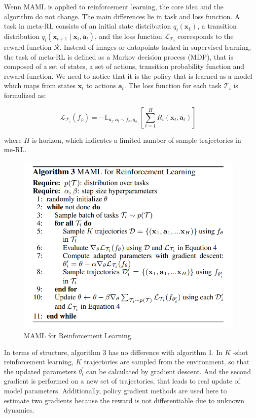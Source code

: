 Wenn MAML is applied to reinforcement learning, the core idea and the algorithm do not change. The main differences lie in task and loss function. A task in meta-RL consists of  
 an initial state distribution $q_{i}\left(\mathbf{x}_{1}\right)$, a transition distribution $q_{i}\left(\mathbf{x}_{t+1} \mid \mathbf{x}_{t}, \mathbf{a}_{t}\right)$, and the loss function $\mathcal{L}_{\mathcal{T}_{i}}$ corresponds to the reward function $\mathcal{R}$. Instead of images or datapoints tasked in supervised learning, the task of meta-RL is defined as a Markov decision process (MDP), that is composed of a set of states, a set of actions, transition probability function and reward function. We need to notice that it is the policy that is learned as a model which maps from states $\mathbf{x}_{t}$ to actions $\mathbf{a}_{t}$. The loss function for each task ${\mathcal{T}_{i}}$
 is formulized as:
 
 $$\mathcal{L}_{\mathcal{T}_{i}}\left(f_{\phi}\right)=-\mathbb{E}_{\mathbf{x}_{t}, \mathbf{a}_{t} \sim f_{\phi}, q_{\mathcal{T}_{i}}}\left[\sum_{t=1}^{H} R_{i}\left(\mathbf{x}_{t}, \mathbf{a}_{t}\right)\right]
 $$
 
 where ${H}$ is horizon, which indicates  a limited number of sample trajectories in me-RL.
 \begin{figure}[H]
	\includegraphics[scale=0.6]{MAML_03.PNG}
	\centering
	\caption{MAML for Reinforcement Learning
}
	\label{MAML}
\end{figure}
In terms of structure, algorithm 3 has no difference with algorithm 1. 
In $K$ -shot reinforcement learning, $K$ trajectories are sampled from the environment, so that the updated parameters $\theta_{i}^{\prime}$ can be calculated by gradient descent. And the second gradient is performed on a new set of trajectories, that leads to real update of model parameters. Additionally, policy gradient methods are used here to estimate two gradients because the reward is not differentiable due to unknown dynamics. 


